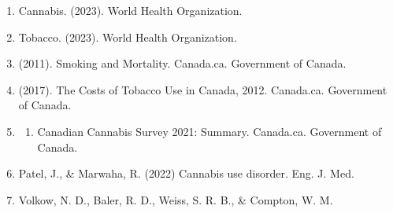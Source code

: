 \documentclass[journal=jacsat,manuscript=article]{achemso}
\providecommand{\tightlist}{%
  \setlength{\itemsep}{0pt}\setlength{\parskip}{0pt}}
\begin{document}
\begin{enumerate}
\def\labelenumi{\arabic{enumi}.}
\item
  Cannabis. (2023). World Health Organization.
\item
  Tobacco. (2023). World Health Organization.
\item
  (2011). Smoking and Mortality. Canada.ca. Government of Canada.
\item
  (2017). The Costs of Tobacco Use in Canada, 2012. Canada.ca.
  Government of Canada.
\item
  \begin{enumerate}
  \def\labelenumii{(\arabic{enumii})}
  \setcounter{enumii}{2020}
  \tightlist
  \item
    Canadian Cannabis Survey 2021: Summary. Canada.ca. Government of
    Canada.
  \end{enumerate}
\item
  Patel, J., \& Marwaha, R. (2022) Cannabis use disorder. Eng. J. Med.
\item
  Volkow, N. D., Baler, R. D., Weiss, S. R. B., \& Compton, W. M.


\end{enumerate}
\end{document}
